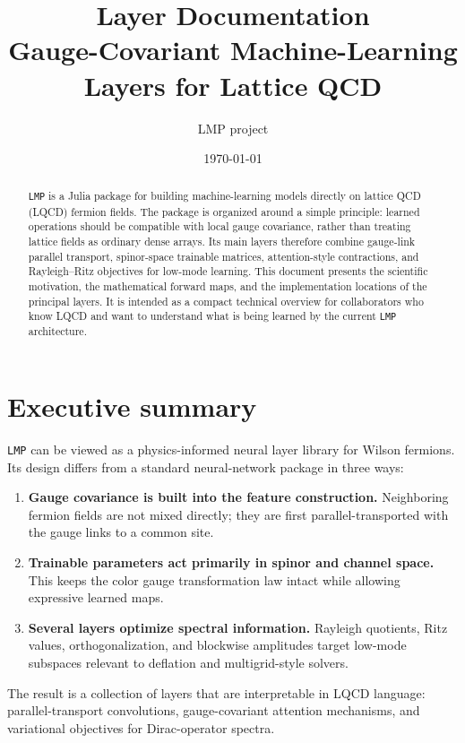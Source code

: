 \documentclass[11pt]{article}
\title{\LMP{} Layer Documentation\\
\large Gauge-Covariant Machine-Learning Layers for Lattice QCD}
\author{LMP project}
\date{\today}
\newcommand{\LMP}{\texttt{LMP}}
\begin{document}
\maketitle

\begin{abstract}
\LMP{} is a Julia package for building machine-learning models directly on
lattice QCD (LQCD) fermion fields. The package is organized around a simple
principle: learned operations should be compatible with local gauge covariance,
rather than treating lattice fields as ordinary dense arrays. Its main layers
therefore combine gauge-link parallel transport, spinor-space trainable
matrices, attention-style contractions, and Rayleigh--Ritz objectives for
low-mode learning. This document presents the scientific motivation, the
mathematical forward maps, and the implementation locations of the principal
layers. It is intended as a compact technical overview for collaborators who
know LQCD and want to understand what is being learned by the current \LMP{}
architecture.
\end{abstract}

\section*{Executive summary}

\LMP{} can be viewed as a physics-informed neural layer library for Wilson
fermions. Its design differs from a standard neural-network package in three
ways:
\begin{enumerate}[leftmargin=*]
  \item \textbf{Gauge covariance is built into the feature construction.}
        Neighboring fermion fields are not mixed directly; they are first
        parallel-transported with the gauge links to a common site.
  \item \textbf{Trainable parameters act primarily in spinor and channel
        space.} This keeps the color gauge transformation law intact while
        allowing expressive learned maps.
  \item \textbf{Several layers optimize spectral information.} Rayleigh
        quotients, Ritz values, orthogonalization, and blockwise amplitudes
        target low-mode subspaces relevant to deflation and multigrid-style
        solvers.
\end{enumerate}

The result is a collection of layers that are interpretable in LQCD language:
parallel-transport convolutions, gauge-covariant attention mechanisms, and
variational objectives for Dirac-operator spectra.
\end{document}
